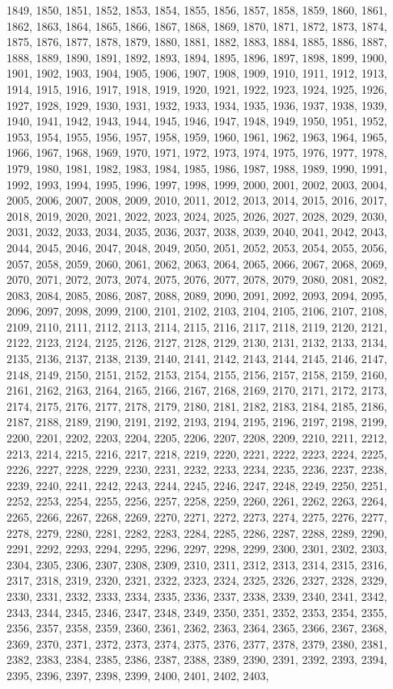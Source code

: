 \documentclass{article}
\begin{document}
{1849, 1850, 1851, 1852, 1853, 1854, 1855, 1856, 1857, 1858, 1859, 1860, 1861, 1862, 1863, 1864, 1865, 1866, 1867, 1868, 1869, 1870, 1871, 1872, 1873, 1874, 1875, 1876, 1877, 1878, 1879, 1880, 1881, 1882, 1883, 1884, 1885, 1886, 1887, 1888, 1889, 1890, 1891, 1892, 1893, 1894, 1895, 1896, 1897, 1898, 1899, 1900, 1901, 1902, 1903, 1904, 1905, 1906, 1907, 1908, 1909, 1910, 1911, 1912, 1913, 1914, 1915, 1916, 1917, 1918, 1919, 1920, 1921, 1922, 1923, 1924, 1925, 1926, 1927, 1928, 1929, 1930, 1931, 1932, 1933, 1934, 1935, 1936, 1937, 1938, 1939, 1940, 1941, 1942, 1943, 1944, 1945, 1946, 1947, 1948, 1949, 1950, 1951, 1952, 1953, 1954, 1955, 1956, 1957, 1958, 1959, 1960, 1961, 1962, 1963, 1964, 1965, 1966, 1967, 1968, 1969, 1970, 1971, 1972, 1973, 1974, 1975, 1976, 1977, 1978, 1979, 1980, 1981, 1982, 1983, 1984, 1985, 1986, 1987, 1988, 1989, 1990, 1991, 1992, 1993, 1994, 1995, 1996, 1997, 1998, 1999, 2000, 2001, 2002, 2003, 2004, 2005, 2006, 2007, 2008, 2009, 2010, 2011, 2012, 2013, 2014, 2015, 2016, 2017, 2018, 2019, 2020, 2021, 2022, 2023, 2024, 2025, 2026, 2027, 2028, 2029, 2030, 2031, 2032, 2033, 2034, 2035, 2036, 2037, 2038, 2039, 2040, 2041, 2042, 2043, 2044, 2045, 2046, 2047, 2048, 2049, 2050, 2051, 2052, 2053, 2054, 2055, 2056, 2057, 2058, 2059, 2060, 2061, 2062, 2063, 2064, 2065, 2066, 2067, 2068, 2069, 2070, 2071, 2072, 2073, 2074, 2075, 2076, 2077, 2078, 2079, 2080, 2081, 2082, 2083, 2084, 2085, 2086, 2087, 2088, 2089, 2090, 2091, 2092, 2093, 2094, 2095, 2096, 2097, 2098, 2099, 2100, 2101, 2102, 2103, 2104, 2105, 2106, 2107, 2108, 2109, 2110, 2111, 2112, 2113, 2114, 2115, 2116, 2117, 2118, 2119, 2120, 2121, 2122, 2123, 2124, 2125, 2126, 2127, 2128, 2129, 2130, 2131, 2132, 2133, 2134, 2135, 2136, 2137, 2138, 2139, 2140, 2141, 2142, 2143, 2144, 2145, 2146, 2147, 2148, 2149, 2150, 2151, 2152, 2153, 2154, 2155, 2156, 2157, 2158, 2159, 2160, 2161, 2162, 2163, 2164, 2165, 2166, 2167, 2168, 2169, 2170, 2171, 2172, 2173, 2174, 2175, 2176, 2177, 2178, 2179, 2180, 2181, 2182, 2183, 2184, 2185, 2186, 2187, 2188, 2189, 2190, 2191, 2192, 2193, 2194, 2195, 2196, 2197, 2198, 2199, 2200, 2201, 2202, 2203, 2204, 2205, 2206, 2207, 2208, 2209, 2210, 2211, 2212, 2213, 2214, 2215, 2216, 2217, 2218, 2219, 2220, 2221, 2222, 2223, 2224, 2225, 2226, 2227, 2228, 2229, 2230, 2231, 2232, 2233, 2234, 2235, 2236, 2237, 2238, 2239, 2240, 2241, 2242, 2243, 2244, 2245, 2246, 2247, 2248, 2249, 2250, 2251, 2252, 2253, 2254, 2255, 2256, 2257, 2258, 2259, 2260, 2261, 2262, 2263, 2264, 2265, 2266, 2267, 2268, 2269, 2270, 2271, 2272, 2273, 2274, 2275, 2276, 2277, 2278, 2279, 2280, 2281, 2282, 2283, 2284, 2285, 2286, 2287, 2288, 2289, 2290, 2291, 2292, 2293, 2294, 2295, 2296, 2297, 2298, 2299, 2300, 2301, 2302, 2303, 2304, 2305, 2306, 2307, 2308, 2309, 2310, 2311, 2312, 2313, 2314, 2315, 2316, 2317, 2318, 2319, 2320, 2321, 2322, 2323, 2324, 2325, 2326, 2327, 2328, 2329, 2330, 2331, 2332, 2333, 2334, 2335, 2336, 2337, 2338, 2339, 2340, 2341, 2342, 2343, 2344, 2345, 2346, 2347, 2348, 2349, 2350, 2351, 2352, 2353, 2354, 2355, 2356, 2357, 2358, 2359, 2360, 2361, 2362, 2363, 2364, 2365, 2366, 2367, 2368, 2369, 2370, 2371, 2372, 2373, 2374, 2375, 2376, 2377, 2378, 2379, 2380, 2381, 2382, 2383, 2384, 2385, 2386, 2387, 2388, 2389, 2390, 2391, 2392, 2393, 2394, 2395, 2396, 2397, 2398, 2399, 2400, 2401, 2402, 2403, }
\end{document}
